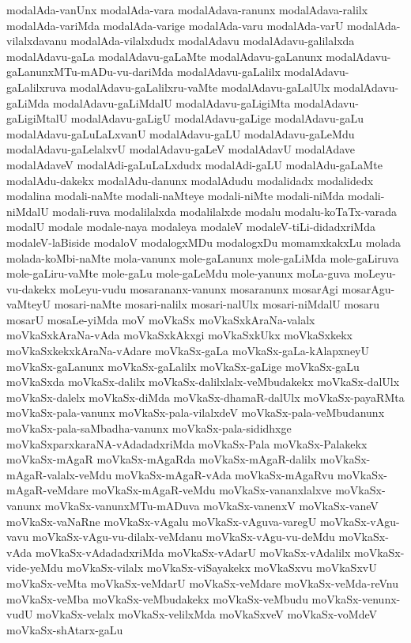 {modalAda-vanUnx
modalAda-vara
modalAdava-ranunx
modalAdava-ralilx
modalAda-variMda
modalAda-varige
modalAda-varu
modalAda-varU
modalAda-vilalxdavanu
modalAda-vilalxdudx
modalAdavu
modalAdavu-galilalxda
modalAdavu-gaLa
modalAdavu-gaLaMte
modalAdavu-gaLanunx
modalAdavu-gaLanunxMTu-mADu-vu-dariMda
modalAdavu-gaLalilx
modalAdavu-gaLalilxruva
modalAdavu-gaLalilxru-vaMte
modalAdavu-gaLalUlx
modalAdavu-gaLiMda
modalAdavu-gaLiMdalU
modalAdavu-gaLigiMta
modalAdavu-gaLigiMtalU
modalAdavu-gaLigU
modalAdavu-gaLige
modalAdavu-gaLu
modalAdavu-gaLuLaLxvanU
modalAdavu-gaLU
modalAdavu-gaLeMdu
modalAdavu-gaLelalxvU
modalAdavu-gaLeV
modalAdavU
modalAdave
modalAdaveV
modalAdi-gaLuLaLxdudx
modalAdi-gaLU
modalAdu-gaLaMte
modalAdu-dakekx
modalAdu-danunx
modalAdudu
modalidadx
modalidedx
modalina
modali-naMte
modali-naMteye
modali-niMte
modali-niMda
modali-niMdalU
modali-ruva
modalilalxda
modalilalxde
modalu
modalu-koTaTx-varada
modalU
modale
modale-naya
modaleya
modaleV
modaleV-tiLi-didadxriMda
modaleV-laBiside
modaloV
modalogxMDu
modalogxDu
momamxkakxLu
molada
molada-koMbi-naMte
mola-vanunx
mole-gaLanunx
mole-gaLiMda
mole-gaLiruva
mole-gaLiru-vaMte
mole-gaLu
mole-gaLeMdu
mole-yanunx
moLa-guva
moLeyu-vu-dakekx
moLeyu-vudu
mosarananx-vanunx
mosaranunx
mosarAgi
mosarAgu-vaMteyU
mosari-naMte
mosari-nalilx
mosari-nalUlx
mosari-niMdalU
mosaru
mosarU
mosaLe-yiMda
moV
moVkaSx
moVkaSxkAraNa-valalx
moVkaSxkAraNa-vAda
moVkaSxkAkxgi
moVkaSxkUkx
moVkaSxkekx
moVkaSxkekxkAraNa-vAdare
moVkaSx-gaLa
moVkaSx-gaLa-kAlapxneyU
moVkaSx-gaLanunx
moVkaSx-gaLalilx
moVkaSx-gaLige
moVkaSx-gaLu
moVkaSxda
moVkaSx-dalilx
moVkaSx-dalilxlalx-veMbudakekx
moVkaSx-dalUlx
moVkaSx-dalelx
moVkaSx-diMda
moVkaSx-dhamaR-dalUlx
moVkaSx-payaRMta
moVkaSx-pala-vanunx
moVkaSx-pala-vilalxdeV
moVkaSx-pala-veMbudanunx
moVkaSx-pala-saMbadha-vanunx
moVkaSx-pala-sididhxge
moVkaSxparxkaraNA-vAdadadxriMda
moVkaSx-Pala
moVkaSx-Palakekx
moVkaSx-mAgaR
moVkaSx-mAgaRda
moVkaSx-mAgaR-dalilx
moVkaSx-mAgaR-valalx-veMdu
moVkaSx-mAgaR-vAda
moVkaSx-mAgaRvu
moVkaSx-mAgaR-veMdare
moVkaSx-mAgaR-veMdu
moVkaSx-vananxlalxve
moVkaSx-vanunx
moVkaSx-vanunxMTu-mADuva
moVkaSx-vanenxV
moVkaSx-vaneV
moVkaSx-vaNaRne
moVkaSx-vAgalu
moVkaSx-vAguva-varegU
moVkaSx-vAgu-vavu
moVkaSx-vAgu-vu-dilalx-veMdanu
moVkaSx-vAgu-vu-deMdu
moVkaSx-vAda
moVkaSx-vAdadadxriMda
moVkaSx-vAdarU
moVkaSx-vAdalilx
moVkaSx-vide-yeMdu
moVkaSx-vilalx
moVkaSx-viSayakekx
moVkaSxvu
moVkaSxvU
moVkaSx-veMta
moVkaSx-veMdarU
moVkaSx-veMdare
moVkaSx-veMda-reVnu
moVkaSx-veMba
moVkaSx-veMbudakekx
moVkaSx-veMbudu
moVkaSx-venunx-vudU
moVkaSx-velalx
moVkaSx-velilxMda
moVkaSxveV
moVkaSx-voMdeV
moVkaSx-shAtarx-gaLu
}
